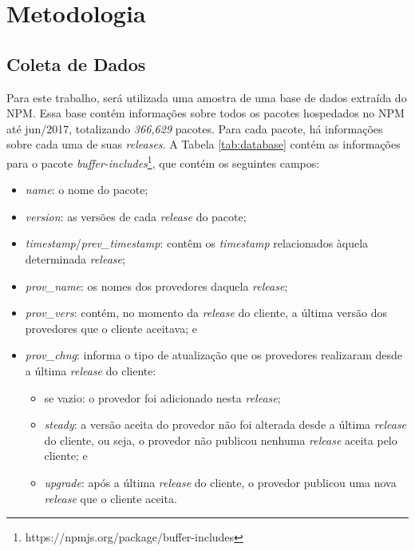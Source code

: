 \chapter{Metodologia}
\label{cap:metodologia}

\section{Coleta de Dados}
\label{sec:col_dados}
Para este trabalho, será utilizada uma amostra de uma base de dados extraída do \gls{NPM}. Essa base contém informações sobre todos os pacotes hospedados no \gls{NPM} até jun/2017, totalizando \textit{366,629} pacotes. Para cada pacote, há informações sobre cada uma de suas \textit{releases}. A Tabela \ref{tab:database} contém as informações para o pacote \textit{buffer-includes}\footnote{https://npmjs.org/package/buffer-includes}, que contém os seguintes campos:

\begin{itemize}
    \item \textit{name}: o nome do pacote;
    \item \textit{version}: as versões de cada \textit{release} do pacote;
    \item \textit{timestamp}/\textit{prev\_timestamp}: contêm os \textit{timestamp} relacionados àquela determinada \textit{release};
    \item \textit{prov\_name}: os nomes dos provedores daquela \textit{release};
    \item \textit{prov\_vers}: contém, no momento da \textit{release} do cliente, a última versão dos provedores que o cliente aceitava; e
    \item \textit{prov\_chng}: informa o tipo de atualização que os provedores realizaram desde a última \textit{release} do cliente:
    \begin{itemize}
        \item se vazio: o provedor foi adicionado nesta \textit{release};
        \item \textit{steady}: a versão aceita do provedor não foi alterada desde a última \textit{release} do cliente, ou seja, o provedor não publicou nenhuma \textit{release} aceita pelo cliente; e
        \item \textit{upgrade}: após a última \textit{release} do cliente, o provedor publicou uma nova \textit{release} que o cliente aceita.
    \end{itemize}
\end{itemize}{}
  
